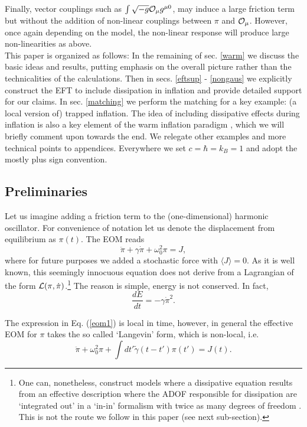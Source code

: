\documentclass[11pt,amsmath,floats,floatfix,nofootinbib,secnumarabic, superscriptaddress, tightenlines]{revtex4}
\newcommand{\beq}{\begin{equation}}
\newcommand{\eeq}{\end{equation}}
\newcommand{\calo}{{\cal O}}
\newcommand{\calL}{{\cal L}}
\begin{document}
Finally, vector couplings such as $\int \sqrt{-g} \calo_\mu g^{\mu0}$, may induce a large friction term but without the addition of non-linear couplings between $\pi$ and $\calo_\mu$. However, once again depending on the model, the non-linear response will produce large non-linearities as above.\\

This paper is organized as follows: In the remaining of sec. \ref{warm} we discuss the basic ideas and results, putting emphasis on the overall picture rather than the technicalities of the calculations. Then in secs. \ref{eftsup} - \ref{nongaus} we explicitly construct the EFT to include dissipation in inflation and provide detailed support for our claims. In sec. \ref{matching} we perform the matching for a key example: (a local version of) trapped inflation. The idea of including dissipative effects during inflation is also a key element of the warm inflation paradigm \cite{berera1,berera2,warm}, which we will briefly comment upon towards the end. We relegate other examples and more technical points to appendices. Everywhere we set $c=\hbar=k_B=1$ and adopt the mostly plus sign convention.

\subsection{Preliminaries}
Let us imagine adding a friction term to the (one-dimensional) harmonic oscillator. For convenience of notation let us denote the displacement from equilibrium as $\pi(t)$. The EOM reads
\beq
\label{eom1}
 \ddot \pi + \gamma\dot \pi + \omega_0^2 \pi = J,
\eeq
where for future purposes we added a stochastic force with $\langle J\rangle=0$.
As it is well known, this seemingly innocuous equation does not derive from a Lagrangian of the form $\calL(\pi,\dot \pi)$.\footnote{
One can, nonetheless, construct models where a dissipative equation results from an effective description where the ADOF responsible for dissipation are `integrated out' in a `in-in' formalism with twice as many degrees of freedom \cite{calzetta,weiss,Zhang}. This is not the route we follow in this paper (see next sub-section).}  The reason is simple, energy is not conserved. In fact,
\beq
\label{eneloss}
\frac{dE}{dt} =-\gamma \dot\pi^2.
\eeq

The expression in Eq. (\ref{eom1}) is local in time, however, in general the effective EOM for $\pi$ takes the so called `Langevin' form, which is non-local, i.e.
\beq
\ddot\pi +\omega_0^2 \pi +  \int dt' \tilde\gamma(t-t')\pi(t') = J(t).
\eeq
\end{document}
